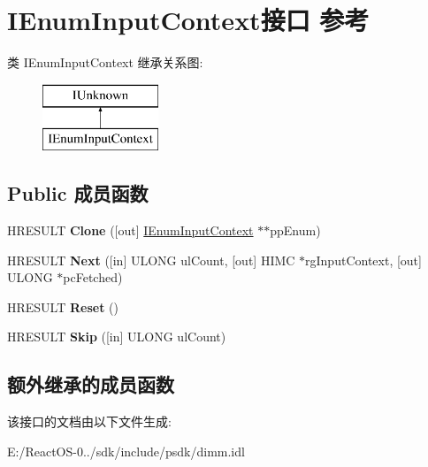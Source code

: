 \hypertarget{interface_i_enum_input_context}{}\section{I\+Enum\+Input\+Context接口 参考}
\label{interface_i_enum_input_context}
类 I\+Enum\+Input\+Context 继承关系图\+:\begin{figure}[H]
\begin{center}
\leavevmode
\includegraphics[height=2.000000cm]{interface_i_enum_input_context}
\end{center}
\end{figure}
\subsection*{Public 成员函数}
\begin{DoxyCompactItemize}
\item 
\mbox{\label{interface_i_enum_input_context_abb40ea3ff3399f5fecd8eb4e1d344b7f}} 
H\+R\+E\+S\+U\+LT {\bfseries Clone} (\mbox{[}out\mbox{]} \hyperlink{interface_i_enum_input_context}{I\+Enum\+Input\+Context} $\ast$$\ast$pp\+Enum)
\item 
\mbox{\label{interface_i_enum_input_context_a3ffdccedf3b90ddea831c2b68690b498}} 
H\+R\+E\+S\+U\+LT {\bfseries Next} (\mbox{[}in\mbox{]} U\+L\+O\+NG ul\+Count, \mbox{[}out\mbox{]} H\+I\+MC $\ast$rg\+Input\+Context, \mbox{[}out\mbox{]} U\+L\+O\+NG $\ast$pc\+Fetched)
\item 
\mbox{\label{interface_i_enum_input_context_a5daff2737a17a88f96f5c4b82e772dd9}} 
H\+R\+E\+S\+U\+LT {\bfseries Reset} ()
\item 
\mbox{\label{interface_i_enum_input_context_a80246d6bbf58b7216ebe1908ce2c8905}} 
H\+R\+E\+S\+U\+LT {\bfseries Skip} (\mbox{[}in\mbox{]} U\+L\+O\+NG ul\+Count)
\end{DoxyCompactItemize}
\subsection*{额外继承的成员函数}


该接口的文档由以下文件生成\+:\begin{DoxyCompactItemize}
\item 
E\+:/\+React\+O\+S-\/0../sdk/include/psdk/dimm.\+idl\end{DoxyCompactItemize}

